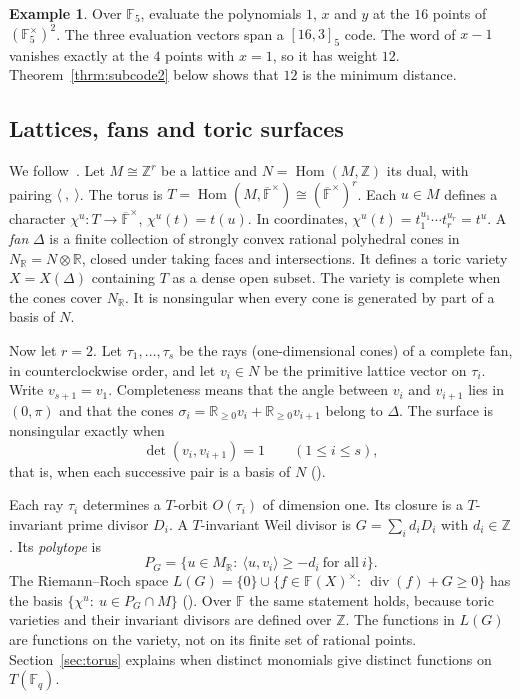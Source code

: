 \documentclass[12pt,letterpaper]{article}
\numberwithin{equation}{section}
\theoremstyle{definition}
\newtheorem{example}[theorem]{Example}
\theoremstyle{remark}
\DeclareMathOperator{\Hom}{Hom}
\DeclareMathOperator{\divisor}{div}
\newcommand{\F}{\mathbb{F}}
\newcommand{\Z}{\mathbb{Z}}
\newcommand{\R}{\mathbb{R}}
\newcommand{\Fq}{\mathbb{F}_q}
\begin{document}
\begin{example}\label{ex:smallcode}
Over $\F_5$, evaluate the polynomials $1$, $x$ and $y$ at the $16$ points of
$(\F_5^\times)^2$. The three evaluation vectors span a $[16,3]_5$ code. The
word of $x-1$ vanishes exactly at the $4$ points with $x=1$, so it has weight
$12$. Theorem~\ref{thrm:subcode2} below shows that $12$ is the minimum
distance.
\end{example}

\subsection{Lattices, fans and toric surfaces}\label{sec:toricbg}

We follow~\cite{Fu93}. Let $M\cong\Z^r$ be a lattice and $N=\Hom(M,\Z)$ its
dual, with pairing $\langle\ ,\ \rangle$. The torus is
$T=\Hom(M,\overline{\F}^\times)\cong(\overline{\F}^\times)^r$. Each $u\in M$
defines a character $\chi^u:T\to\overline{\F}^\times$, $\chi^u(t)=t(u)$. In
coordinates, $\chi^u(t)=t_1^{u_1}\cdots t_r^{u_r}=t^u$. A \emph{fan}
$\Delta$ is a finite collection of strongly convex rational polyhedral cones
in $N_\R=N\otimes\R$, closed under taking faces and intersections. It defines
a toric variety $X=X(\Delta)$ containing $T$ as a dense open subset. The
variety is complete when the cones cover $N_\R$. It is nonsingular when every
cone is generated by part of a basis of $N$.

Now let $r=2$. Let $\tau_1,\dots,\tau_s$ be the rays (one-dimensional cones)
of a complete fan, in counterclockwise order, and let $v_i\in N$ be the
primitive lattice vector on $\tau_i$. Write $v_{s+1}=v_1$. Completeness means
that the angle between $v_i$ and $v_{i+1}$ lies in $(0,\pi)$ and that the
cones $\sigma_i=\R_{\ge0}v_i+\R_{\ge0}v_{i+1}$ belong to $\Delta$. The surface
is nonsingular exactly when
\begin{equation}\label{eq:smooth}
\det(v_i,v_{i+1})=1\qquad(1\le i\le s),
\end{equation}
that is, when each successive pair is a basis of $N$ (\cite[\S2.1]{Fu93}).

Each ray $\tau_i$ determines a $T$-orbit $O(\tau_i)$ of dimension one. Its
closure is a $T$-invariant prime divisor $D_i$. A $T$-invariant Weil divisor
is $G=\sum_i d_iD_i$ with $d_i\in\Z$. Its \emph{polytope} is
\begin{equation}\label{eq:PG}
P_G=\{u\in M_\R:\ \langle u,v_i\rangle\ge-d_i\ \text{for all}\ i\}.
\end{equation}
The Riemann--Roch space
$L(G)=\{0\}\cup\{f\in\F(X)^\times:\ \divisor(f)+G\ge0\}$ has the basis
$\{\chi^u:\ u\in P_G\cap M\}$ (\cite[\S3.4]{Fu93}). Over $\F$ the same
statement holds, because toric varieties and their invariant divisors are
defined over $\Z$. The functions in $L(G)$ are functions on the variety, not on
its finite set of rational points. Section~\ref{sec:torus} explains when
distinct monomials give distinct functions on $T(\Fq)$.
\end{document}
